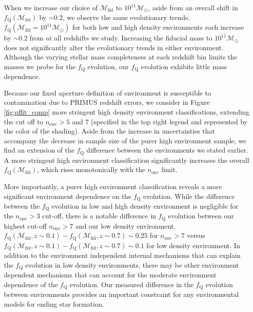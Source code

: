 \documentclass{emulateapj}
\begin{document}
When we increase our choice of $\mathcal{M}_{\mathrm{fid}}$ to $10^{11}
\mathcal{M}_\odot$, aside from an overall shift in
$f_{\mathrm{Q}}(\mathcal{M}_{\mathrm{fid}})$ by $\sim 0.2$, we observe the
same evolutionary trends. $f_{\mathrm{Q}}(\mathcal{M}_{\mathrm{fid}} =
10^{11}\mathcal{M}_{\odot})$ for both low and high density
environments each increase by $\sim 0.2$ from at all redshifts we
study. Increasing the fiducial mass to $10^{11}
\mathcal{M}_{\odot}$ does not significantly alter the evolutionary
trends in either environment. Although the varying stellar mass
completeness at each redshift bin limits the masses we probe for the
$f_{\mathrm{Q}}$ evolution, our $f_{\mathrm{Q}}$ evolution exhibits little
mass dependence.

Because our fixed aperture definition of environment is susceptible to
contamination due to PRIMUS redshift errors, we consider in Figure
\ref{fig:qffit_comp} more stringent high density environment
classifications, extending the cut off to $n_{\mathrm{env}} > 5$ and
$7$ (specified in the top right legend and represented by the color of
the shading). Aside from the increase in uncertainties that accompany
the decrease in sample size of the purer high environment sample, we
find an extension of the $f_{\mathrm{Q}}$ difference between the
environments we stated earlier. A more stringent high environment
classification significantly increases the overall
$f_{\mathrm{Q}}(\mathcal{M}_{\mathrm{fid}})$, which rises monotonically with
the $n_{\mathrm{env}}$ limit.

More importantly, a purer high environment classification reveals a
more significant environment dependence on the $f_{\mathrm{Q}}$
evolution. While the difference between the $f_{\mathrm{Q}}$ evolution in
low and high density environment is negligible for the $n_{\mathrm{env}} >
3$ cut-off, there is a notable difference in $f_{\mathrm{Q}}$
evolution between our highest cut-off $n_{\mathrm{env}} > 7$ and our low
density environment. $f_{\mathrm{Q}}(\mathcal{M}_{\mathrm{fid}}, z
\sim 0.1) - f_{\mathrm{Q}}(\mathcal{M}_{\mathrm{fid}}, z \sim 0.7)
\sim 0.25$ for $n_{\mathrm{env}} > 7$ versus
$f_{\mathrm{Q}}(\mathcal{M}_{\mathrm{fid}}, z \sim 0.1) -
f_{\mathrm{Q}}(\mathcal{M}_{\mathrm{fid}}, z \sim 0.7) \sim 0.1$ for
low density environment. In addition to the
environment independent internal mechanisms that can explain the
$f_{\mathrm{Q}}$ evolution in low density environments, there may be other
environment dependent mechanisms that can account for the moderate
environment dependence of the $f_{\mathrm{Q}}$ evolution. Our measured
difference in the $f_{\mathrm{Q}}$ evolution between environments provides
an important constraint for any environmental models for ending star
formation.
\end{document}
